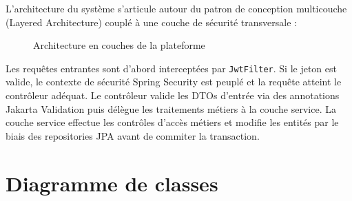 \documentclass[12pt,a4paper]{report}
\begin{document}
L'architecture du système s'articule autour du patron de conception multicouche (Layered Architecture) couplé à une couche de sécurité transversale :

\begin{figure}[H]
\centering
{}
\caption{Architecture en couches de la plateforme}
\end{figure}

Les requêtes entrantes sont d'abord interceptées par \verb|JwtFilter|. Si le jeton est valide, le contexte de sécurité Spring Security est peuplé et la requête atteint le contrôleur adéquat. Le contrôleur valide les DTOs d'entrée via des annotations Jakarta Validation puis délègue les traitements métiers à la couche service. La couche service effectue les contrôles d'accès métiers et modifie les entités par le biais des repositories JPA avant de commiter la transaction.

\section{Diagramme de classes}
\end{document}
